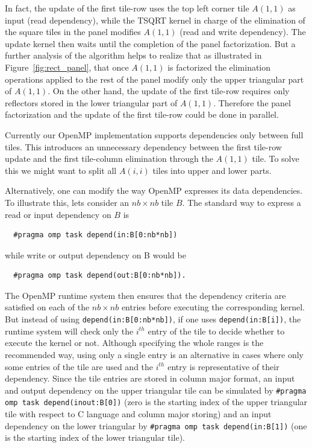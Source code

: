 In fact, the update of the first tile-row uses the top
left corner tile $A(1,1)$ as input (read dependency), while the TSQRT
kernel in charge of the elimination of the square tiles in the panel
modifies $A(1,1)$ (read and write dependency). The update kernel then
waits until the completion of the panel factorization. But a further
analysis of the algorithm helps to realize that as illustrated in
Figure~\ref{fig:rect_panel}, that once $A(1,1)$ is factorized the
elimination operations applied to the rest of the panel modify only
the upper triangular part of $A(1,1)$. On the other hand, the update
of the first tile-row requires only reflectors stored in the lower
triangular part of $A(1,1)$.
Therefore the panel factorization and the update of
the first tile-row could be done in parallel.

Currently our OpenMP implementation supports dependencies only
between full tiles.
This introduces an unnecessary dependency between
the first tile-row update and the first tile-column
elimination through the $A(1,1)$ tile.
To solve this we might want to
split all $A(i,i)$ tiles into upper and lower parts.

Alternatively, one can modify the way OpenMP expresses
its data dependencies.
To illustrate this, lets consider an $nb \times nb$ tile $B$.
The standard way to express a read or input dependency on $B$ is
\begin{lstlisting}
  #pragma omp task depend(in:B[0:nb*nb])
\end{lstlisting}
while write or output dependency on B would be
\begin{lstlisting}
  #pragma omp task depend(out:B[0:nb*nb]).
\end{lstlisting}

The OpenMP runtime system then ensures that the dependency criteria
are satisfied on each of the $nb \times nb$ entries before executing
the corresponding kernel. But instead of using
\texttt{depend(in:B[0:nb*nb])}, if one uses \texttt{depend(in:B[i])},
the runtime system will check only the $i^{th}$ entry of the tile to
decide whether to execute the kernel or not. Although specifying the
whole ranges is the recommended way, using only a single entry is an
alternative in cases where only some entries of the tile are used and
the $i^{th}$ entry is representative of their dependency. Since the
tile entries are stored in column major format, an input and output
dependency on the upper triangular tile can be simulated by
\texttt{\#pragma omp task depend(inout:B[0])} (zero is the starting
index of the upper triangular tile with respect to C language and
column major storing) and an input dependency on the
lower triangular by \texttt{\#pragma omp task depend(in:B[1])} (one is
the starting index of the lower triangular tile).

